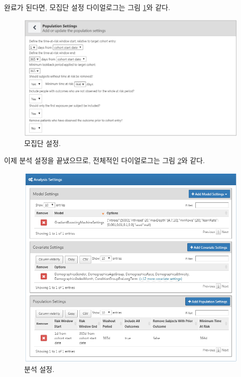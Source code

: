 \documentclass[11pt]{book}
\theoremstyle{definition}
\theoremstyle{definition}
\theoremstyle{definition}
\theoremstyle{remark}
\begin{document}
완료가 된다면, 모집단 설정 다이얼로그는 그림
\ref{fig:populationSettings}와 같다.

\begin{figure}

{\centering \includegraphics[width=1\linewidth]{images/PatientLevelPrediction/populationSettings} 

}

\caption{모집단 설정.}\label{fig:populationSettings}
\end{figure}

이제 분석 설정을 끝냈으므로, 전체적인 다이얼로그는 그림
\ref{fig:analysisSettings}와 같다.

\begin{figure}

{\centering \includegraphics[width=1\linewidth]{images/PatientLevelPrediction/analysisSettings} 

}

\caption{분석 설정.}\label{fig:analysisSettings}
\end{figure}
\end{document}
